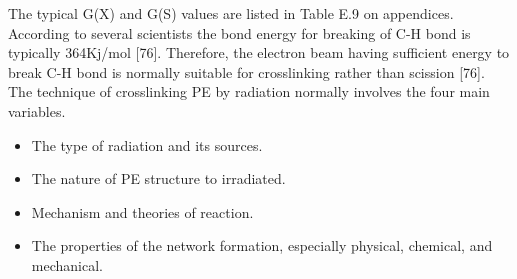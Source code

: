 \documentclass[12pt]{report}
\begin{document}
The typical G(X) and G(S) values are listed in Table E.9 on appendices. \\

According to several scientists the bond energy for breaking of C-H bond is typically 364Kj/mol [76]. Therefore, the electron beam having sufficient energy to break C-H bond is normally suitable for crosslinking rather than scission [76]. The technique of crosslinking PE by radiation normally involves the four main variables. 

\begin{itemize}
    \item The type of radiation and its sources.
    \item The nature of PE structure to irradiated.
    \item Mechanism and theories of reaction.
    \item The properties of the network formation, especially physical, chemical, and mechanical. 
\end{itemize}
\end{document}

